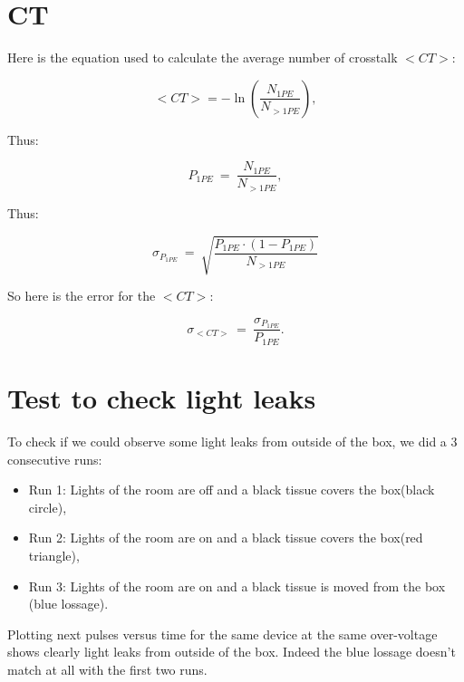 \documentclass[a4paper, 11pt]{report}%
\begin{document}
  \section{CT}
  
  Here is the equation used to calculate the average number of crosstalk $<CT>$:
  
  \begin{equation}
    <CT> = -\ln(\frac{N_{1PE}}{N_{>1PE}}),
  \end{equation}  
  
  Thus:
  
  \begin{equation}
    P_{1PE}\ =\ \frac{N_{1PE}}{N_{>1PE}},    
  \end{equation}
  
  Thus:
  
  \begin{equation}
    \sigma_{P_{1PE}}\ =\ \sqrt{\frac{P_{1PE}\cdot(1-P_{1PE})}{N_{>1PE}}}  
  \end{equation}
  
  So here is the error for the $<CT>$:
  
  \begin{equation}
    \sigma_{<CT>}\ =\ \frac{\sigma_{P_{1PE}}}{P_{1PE}}.
  \end{equation}
  
  \section{Test to check light leaks}
  
  To check if we could observe some light leaks from outside of the box, we did a 3 consecutive runs:
  
  \begin{itemize}
   \item Run 1: Lights of the room are off and a black tissue covers the box(black circle),
   \item Run 2: Lights of the room are on and a black tissue covers the box(red triangle),
   \item Run 3: Lights of the room are on and a black tissue is moved from the box (blue lossage).
  \end{itemize}

  \newpage
  
  Plotting next pulses versus time for the same device at the same over-voltage shows clearly light leaks from outside of the box. Indeed the blue 
  lossage doesn't match at all with the first two runs. 
  
\end{document}
